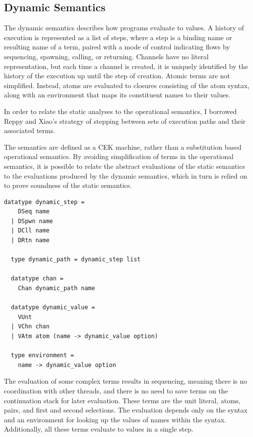 \documentclass[letterpaper, 11pt]{extarticle}
\begin{document}
\subsection{Dynamic Semantics}
The dynamic semantics describes how programs evaluate to values.
A history of execution is represented as a list of steps, where a step is a
binding name or resulting name of a term, paired with a mode of control indicating
flows by sequencing, spawning, calling, or returning.
Channels have no literal representation, but each
time a channel is created, it is uniquely identified by the history of the execution up until
the step of creation. Atomic terms are not simplified. Instead, atoms are evaluated to
closures consisting of the atom syntax, along with an environment that maps its
constituent names to their values.

In order to relate the static analyses to the operational semantics, I
borrowed Reppy and Xiao's strategy of stepping between sets of execution paths and
their associated terms.

The semantics are defined as a CEK machine, rather than a
substitution based operational semantics. By avoiding simplification of terms in the
operational semantics, it is possible to relate
the abstract evaluations of the static semantics to the
evaluations produced by the dynamic semantics,
which in turn is relied on to prove soundness of the static semantics.


\begin{lstlisting}[language=logic]
  datatype dynamic_step =
    DSeq name
  | DSpwn name
  | DCll name
  | DRtn name 

  type dynamic_path = dynamic_step list

  datatype chan =
    Chan dynamic_path name 

  datatype dynamic_value = 
    VUnt
  | VChn chan
  | VAtm atom (name -> dynamic_value option)

  type environment =
    name -> dynamic_value option
\end{lstlisting}

The evaluation of some complex terms results in sequencing, meaning there is no coordination
with other threads, and there is no need to save terms on
the continuation stack for later evaluation. These terms are the
unit literal, atoms, pairs, and first and second selections. The evaluation depends only
on the syntax and an environment for looking up the values of names within the syntax.
Additionally, all these terms evaluate to values in a single step.
\end{document}
